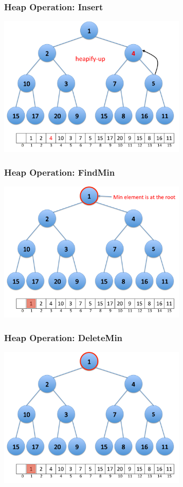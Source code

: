 \documentclass{beamer}
\begin{document}
\begin{frame}[containsverbatim]
\frametitle{Heap Operation: Insert}

\begin{center}
\includegraphics[width=9cm]{heap_insert4.pdf}
\end{center}

\end{frame}

\begin{frame}[containsverbatim]
\frametitle{Heap Operation: FindMin}

\begin{center}
\includegraphics[width=9cm]{heap_find_min.pdf}
\end{center}

\end{frame}

\begin{frame}[containsverbatim]
\frametitle{Heap Operation: DeleteMin}

\begin{center}
\includegraphics[width=9cm]{heap_delete_min1.pdf}
\end{center}

\end{frame}
\end{document}
